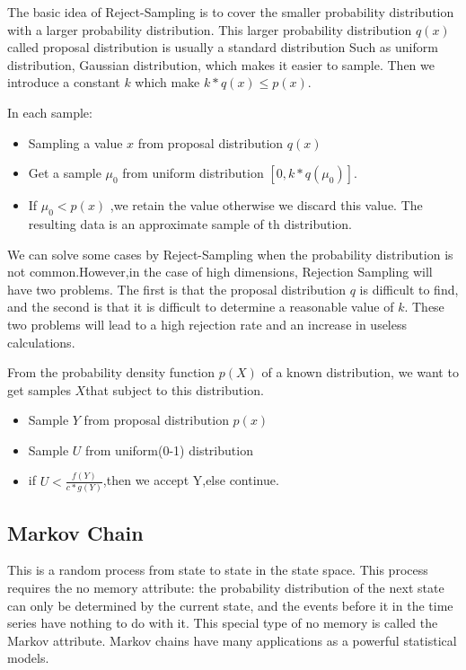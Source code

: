 The basic idea of Reject-Sampling \cite{samp} is to cover the smaller probability distribution with a larger probability distribution. This larger probability distribution $q(x)$ called proposal distribution  is usually a standard distribution Such as uniform distribution, Gaussian distribution, which makes it easier to sample. Then we introduce a constant $k$ which make $k*q(x) \leq p(x)$.

 In each sample:

\begin{itemize}
  \item Sampling a value $x$ from proposal distribution $q(x)$
  \item Get a sample $\mu_0$ from uniform distribution $[0,k*q(\mu_0)]$.
  \item If $\mu_0 < p(x)$ ,we retain the value otherwise we discard this value. The resulting data is an approximate sample of th distribution.
\end{itemize}

We can solve some cases  by Reject-Sampling when the probability distribution is not common.However,in the case of high dimensions, Rejection Sampling will have two problems. The first is that the proposal  distribution $q$ is difficult to find, and the second is that it is difficult to determine a reasonable value of $k$. These two problems will lead to a high rejection rate and an increase in useless calculations.


From the probability density function $p(X)$ of a known distribution, we want to get  samples $X$that subject to this distribution.
\begin{itemize}
  \item Sample $Y$ from proposal distribution $p(x)$
  \item Sample $U$ from uniform(0-1) distribution
  \item if $U<\frac{f(Y)}{c*g(Y)}$,then we accept Y,else continue.
\end{itemize}


\subsection{Markov Chain}
This is a random process from state to state in the state space. This process requires the no memory attribute: the probability distribution of the next state can only be determined by the current state, and the events before it in the time series have nothing to do with it. This special type of no memory is called the Markov attribute. Markov chains have many applications as a powerful statistical models.

